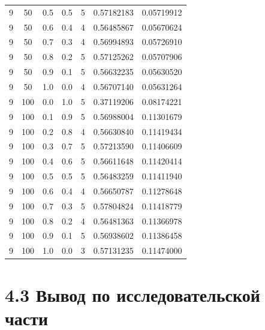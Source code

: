 \documentclass[12pt, a4paper]{report}
\begin{document}
\begin{table} [H]
\begin{tabular}[l]{|c c c c c c c|}
			9 & 50 & 0.5 & 0.5 & 5 & 0.57182183 & 0.05719912 \\
			
			9 & 50 & 0.6 & 0.4 & 4 & 0.56485867 & 0.05670624 \\
			
			9 & 50 & 0.7 & 0.3 & 4 & 0.56994893 & 0.05726910 \\
			
			9 & 50 & 0.8 & 0.2 & 5 & 0.57125262 & 0.05707906 \\
			
			9 & 50 & 0.9 & 0.1 & 5 & 0.56632235 & 0.05630520 \\
			
			9 & 50 & 1.0 & 0.0 & 4 & 0.56707140 & 0.05631264 \\
			
			9 & 100 & 0.0 & 1.0 & 5 & 0.37119206 & 0.08174221 \\
			
			9 & 100 & 0.1 & 0.9 & 5 & 0.56988004 & 0.11301679 \\
			
			9 & 100 & 0.2 & 0.8 & 4 & 0.56630840 & 0.11419434 \\
			
			9 & 100 & 0.3 & 0.7 & 5 & 0.57213590 & 0.11406609 \\
			
			9 & 100 & 0.4 & 0.6 & 5 & 0.56611648 & 0.11420414 \\
			
			9 & 100 & 0.5 & 0.5 & 5 & 0.56483259 & 0.11411940 \\
			
			9 & 100 & 0.6 & 0.4 & 4 & 0.56650787 & 0.11278648 \\
			
			9 & 100 & 0.7 & 0.3 & 5 & 0.57804824 & 0.11418779 \\
			
			9 & 100 & 0.8 & 0.2 & 4 & 0.56481363 & 0.11366978 \\
			
			9 & 100 & 0.9 & 0.1 & 5 & 0.56938602 & 0.11386458 \\
			
			9 & 100 & 1.0 & 0.0 & 3 & 0.57131235 & 0.11474000 \\\hline
		\end{tabular}
	\end{table}
	
	\section*{4.3 Вывод по исследовательской части}
	
\end{document}
